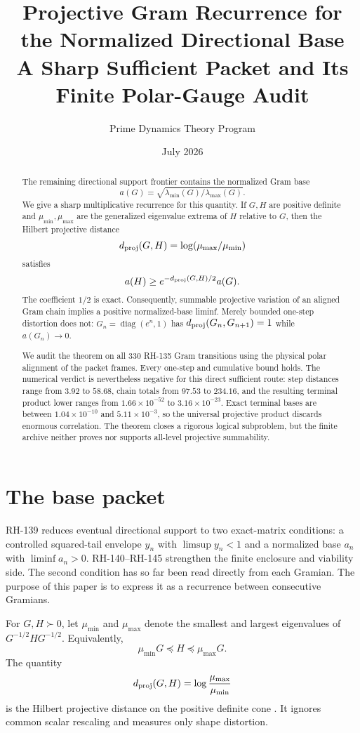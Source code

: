 \documentclass[12pt]{article}
\title{Projective Gram Recurrence for the Normalized Directional Base\\\large A Sharp Sufficient Packet and Its Finite Polar-Gauge Audit}
\author{Prime Dynamics Theory Program}
\date{July 2026}
\begin{document}
\maketitle

\begin{abstract}
The remaining directional support frontier contains the normalized Gram base
\[
 a(G)=\sqrt{\lambda_{\min}(G)/\lambda_{\max}(G)}.
\]
We give a sharp multiplicative recurrence for this quantity.  If $G,H$ are
positive definite and $\mu_{\min},\mu_{\max}$ are the generalized
eigenvalue extrema of $H$ relative to $G$, then the Hilbert projective
distance
\[
 d_{\rm proj}(G,H)=\log(\mu_{\max}/\mu_{\min})
\]
satisfies
\[
 a(H)\geq e^{-d_{\rm proj}(G,H)/2}a(G).
\]
The coefficient $1/2$ is exact.  Consequently, summable projective variation
of an aligned Gram chain implies a positive normalized-base liminf.  Merely
bounded one-step distortion does not: $G_n=\operatorname{diag}(e^n,1)$ has
$d_{\rm proj}(G_n,G_{n+1})=1$ while $a(G_n)\to0$.

We audit the theorem on all 330 RH-135 Gram transitions using the physical
polar alignment of the packet frames.  Every one-step and cumulative bound
holds.  The numerical verdict is nevertheless negative for this direct
sufficient route: step distances range from $3.92$ to $58.68$, chain totals
from $97.53$ to $234.16$, and the resulting terminal product lower ranges
from $1.66\times10^{-52}$ to $3.16\times10^{-23}$.  Exact terminal bases are
between $1.04\times10^{-10}$ and $5.11\times10^{-3}$, so the universal
projective product discards enormous correlation.  The theorem closes a
rigorous logical subproblem, but the finite archive neither proves nor
supports all-level projective summability.
\end{abstract}

\section{The base packet}
RH-139 reduces eventual directional support to two exact-matrix conditions:
a controlled squared-tail envelope $y_n$ with $\limsup y_n<1$ and a
normalized base $a_n$ with $\liminf a_n>0$.  RH-140--RH-145 strengthen the
finite enclosure and viability side.  The second condition has so far been
read directly from each Gramian.  The purpose of this paper is to express it
as a recurrence between consecutive Gramians.

For $G,H\succ0$, let $\mu_{\min}$ and $\mu_{\max}$ denote the smallest and
largest eigenvalues of $G^{-1/2}HG^{-1/2}$.  Equivalently,
\begin{equation}\label{eq:loewner}
 \mu_{\min}G\preceq H\preceq\mu_{\max}G.
\end{equation}
The quantity
\[
 d_{\rm proj}(G,H)=\log\frac{\mu_{\max}}{\mu_{\min}}
\]
is the Hilbert projective distance on the positive definite cone
\citep{Birkhoff1957,Bushell1973,Bhatia2007}.  It ignores common scalar
rescaling and measures only shape distortion.
\end{document}
